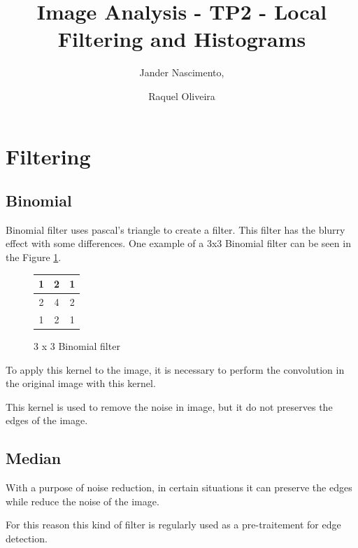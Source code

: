 \documentclass{article}
\begin{document}
\title{Image Analysis - TP2 - Local Filtering and Histograms}

\author{Jander Nascimento, 
\and Raquel Oliveira}

\maketitle

\section{Filtering}
	
	\subsection{Binomial}

		Binomial filter uses pascal's triangle to create a filter. This filter has the blurry effect with some differences.
One example of a 3x3 Binomial filter can be seen in the Figure \ref{3x3binomial}.

\begin{figure}[H]
  \begin{center}
  \begin{tabular}{ | c | c | c | }
    \hline
    1 & 2 & 1 \\ \hline

    2 & 4 & 2 \\ \hline

    1 & 2 & 1 \\
    \hline
  \end{tabular}
  \end{center}
  \caption{3 x 3 Binomial filter\label{3x3binomial}}\end{figure}

		To apply this kernel to the image, it is necessary to perform the convolution in the original image with this kernel.

		This kernel is used to remove the noise in image, but it do not preserves the edges of the image. 
		
	\subsection{Median}

		With a purpose of noise reduction, in certain situations it can preserve the edges while reduce the noise of the image.

		For this reason this kind of filter is regularly used as a pre-traitement for edge detection.
\end{document}
